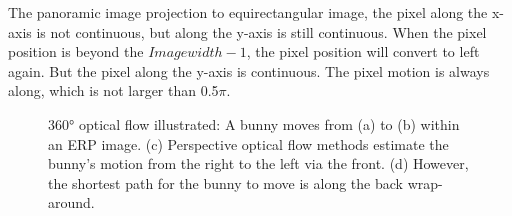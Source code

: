 The panoramic image projection to equirectangular image, the pixel along the x-axis is not continuous, but along the y-axis is still continuous. When the pixel position is beyond the  ${Imagewidth -1}$, the pixel position will convert to left again.
But the pixel along the y-axis is continuous.
The pixel motion is always along, which is not larger than 0.5$\pi$.


\begin{figure}%
	\centering
	\caption{\label{fig:app:warparound}%
		360° optical flow illustrated:
		A bunny moves from (a) to (b) within an ERP image.
		(c) Perspective optical flow methods estimate the bunny's motion from the right to the left via the front.
		(d) However, the shortest path for the bunny to move is along the back wrap-around.		
	}
\end{figure}


